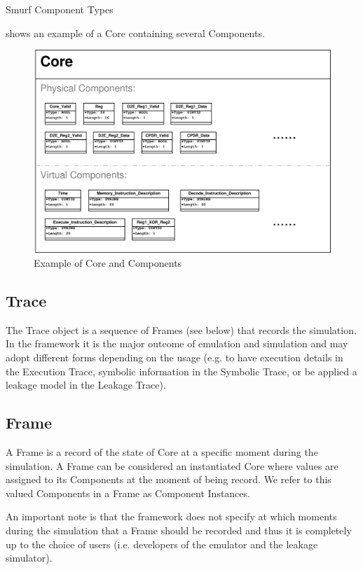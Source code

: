 \documentclass[]{report}
\begin{document}
\begin{table}
	\centering
	
	\caption{Smurf Component Types\label{tbl:ComponentTypes}}
\end{table}

 shows an example of a Core containing several Components.

\begin{figure}
	\centering
	\includegraphics[width=0.8\linewidth]{Figures/Core.eps}
	\caption{Example of Core and Components\label{fig:CoreAndComponents}}
\end{figure}

\subsection{Trace}
The Trace object is a sequence of Frames (see below) that records the simulation. In the \smurf framework it is the major outcome of emulation and simulation and may adopt different forms depending on the usage (e.g. to have execution details in the Execution Trace, symbolic information in the Symbolic Trace, or be applied a leakage model in the Leakage Trace).

\subsection{Frame}
A Frame is a record of the state of Core at a specific moment during the simulation. A Frame can be considered an instantiated Core where values are assigned to its Components at the moment of being record. We refer to this valued Components in a Frame as Component Instances.

An important note is that the \smurf framework does not specify at which moments during the simulation that a Frame should be recorded and thus it is completely up to the choice of users (i.e. developers of the emulator and the leakage simulator). 
\end{document}
